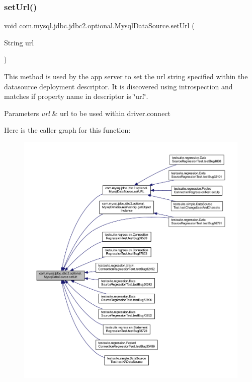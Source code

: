 \subsubsection{\texorpdfstring{set\+Url()}{setUrl()}}
{\footnotesize\ttfamily void com.\+mysql.\+jdbc.\+jdbc2.\+optional.\+Mysql\+Data\+Source.\+set\+Url (\begin{DoxyParamCaption}\item[{String}]{url }\end{DoxyParamCaption})}

This method is used by the app server to set the url string specified within the datasource deployment descriptor. It is discovered using introspection and matches if property name in descriptor is \char`\"{}url\char`\"{}.


\begin{DoxyParams}{Parameters}
{\em url} & url to be used within driver.\+connect \\
\hline
\end{DoxyParams}
Here is the caller graph for this function\+:
\nopagebreak
\begin{figure}[H]
\begin{center}
\leavevmode
\includegraphics[width=350pt]{classcom_1_1mysql_1_1jdbc_1_1jdbc2_1_1optional_1_1_mysql_data_source_abdeb3391c72e2633372294991d9291fb_icgraph}
\end{center}
\end{figure}
\mbox{\label{classcom_1_1mysql_1_1jdbc_1_1jdbc2_1_1optional_1_1_mysql_data_source_ac80d398633ea31db75d7fbbba6f14c20}} 
